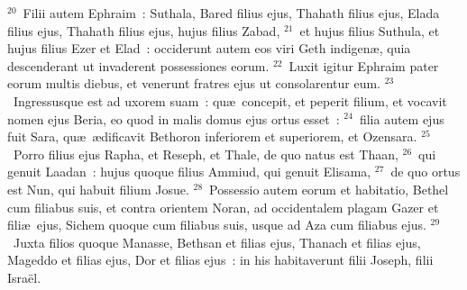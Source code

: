 ${}^{20}$~Filii autem Ephraim~: Suthala, Bared filius ejus, Thahath filius ejus, Elada filius ejus, Thahath filius ejus, hujus filius Zabad,
${}^{21}$~et hujus filius Suthula, et hujus filius Ezer et Elad~: occiderunt autem eos viri Geth indigen\ae , quia descenderant ut invaderent possessiones eorum.
${}^{22}$~Luxit igitur Ephraim pater eorum multis diebus, et venerunt fratres ejus ut consolarentur eum.
${}^{23}$~Ingressusque est ad uxorem suam~: qu\ae\ concepit, et peperit filium, et vocavit nomen ejus Beria, eo quod in malis domus ejus ortus esset~:
${}^{24}$~filia autem ejus fuit Sara, qu\ae\ \ae dificavit Bethoron inferiorem et superiorem, et Ozensara.
${}^{25}$~Porro filius ejus Rapha, et Reseph, et Thale, de quo natus est Thaan,
${}^{26}$~qui genuit Laadan~: hujus quoque filius Ammiud, qui genuit Elisama,
${}^{27}$~de quo ortus est Nun, qui habuit filium Josue.
${}^{28}$~Possessio autem eorum et habitatio, Bethel cum filiabus suis, et contra orientem Noran, ad occidentalem plagam Gazer et fili\ae\ ejus, Sichem quoque cum filiabus suis, usque ad Aza cum filiabus ejus.
${}^{29}$~Juxta filios quoque Manasse, Bethsan et filias ejus, Thanach et filias ejus, Mageddo et filias ejus, Dor et filias ejus~: in his habitaverunt filii Joseph, filii Isra\"el.


